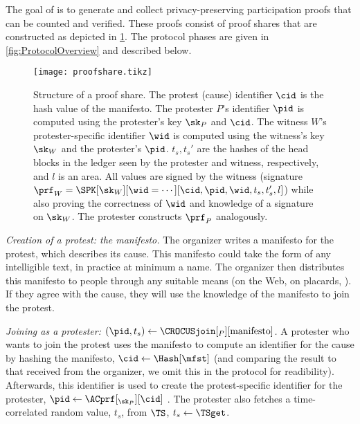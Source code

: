 The goal of \CROCUS is to generate and collect privacy-preserving
participation proofs that can be counted and verified. These proofs
consist of proof shares that are constructed as depicted in
\cref{fig:ProofFig}. The protocol phases are given in
\cref{fig:ProtocolOverview} and described below.

\begin{figure}
  \centering
  \small
  \texttt{[image: proofshare.tikz]}
  \caption{%
    Structure of a proof share.
    The protest (cause) identifier \(\cid\) is the hash value of the manifesto.
    The protester \(P\)'s identifier \(\pid\) is computed using the protester's key \(\sk_P\) and \(\cid\).
    The witness \(W\)'s protester-specific identifier \(\wid\) is computed using the
    witness's key \(\sk_W\) and the protester's \(\pid\).
    \(t_s, t_s'\) are the hashes of the head blocks in the ledger seen by the 
    protester and witness, respectively, and \(l\) is an area.
    All values are signed by the witness (signature \(\prf_W = \SPK[\sk_W][\wid 
      = \dotsb][\cid, \pid, \wid, t_s, t_s', l]\)) while also proving the 
    correctness of \(\wid\) and knowledge of a signature on \(\sk_W\).
    The protester constructs \(\prf_P\) analogously.
  }%
  \label{fig:ProofFig}
\end{figure}%


\emph{Creation of a protest: the manifesto.}
The organizer writes a manifesto for the protest, which describes its cause.
This manifesto could take the form of any intelligible text, in
practice at minimum a name.
The organizer then distributes this manifesto to people through
any suitable means  (\eg on the Web, on placards, \etc).
If they agree with the cause, they will use the knowledge of the
manifesto to join the protest. 


\emph{Joining as a protester: \((\pid, t_s)\gets 
    \CROCUSjoin[_P][\text{manifesto}]\).}
A protester who wants to join the protest uses the manifesto to
compute an identifier for the cause by hashing the manifesto,
\(\cid\gets \Hash[\mfst]\) (and comparing the result to that received
from the organizer, we omit this in the protocol for readibility).
Afterwards, this identifier is used to create the protest-specific identifier 
for the protester, \(\pid\gets \ACprf[_{\sk_P}][\cid]\)%
.
The protester also fetches a time-correlated random value, \(t_s\), from 
\(\TS\), \(t_s\gets \TSget\).


